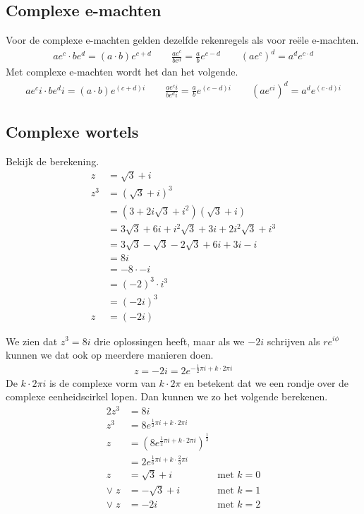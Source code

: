 \documentclass[11pt,fleqn]{book} %
\begin{document}
\subsection{Complexe e-machten}
Voor de complexe e-machten gelden dezelfde rekenregels als voor reële e-machten.
\begin{align*}
ae^c\cdot be^d=(a\cdot b)e^{c+d}\qquad \frac{ae^c}{be^d}=\frac{a}{b}e^{c-d}\qquad (ae^c)^d=a^de^{c\cdot d}
\end{align*}
Met complexe e-machten wordt het dan het volgende.
\begin{align*}
ae^ci\cdot be^di=(a\cdot b)e^{(c+d)i}\qquad \frac{ae^ci}{be^di}=\frac{a}{b}e^{(c-d)i}\qquad (ae^{ci})^d=a^de^{(c\cdot d)i}
\end{align*}

\subsection{Complexe wortels}
Bekijk de berekening.
\begin{align*}
z &= \sqrt{3}+i\\
z^3 &= (\sqrt{3}+i)^3\\
&= (3+2i\sqrt{3}+i^2)(\sqrt{3}+i)\\
&= 3\sqrt{3}+6i+i^2\sqrt{3}+3i+2i^2\sqrt{3}+i^3\\
&= 3\sqrt{3}-\sqrt{3}-2\sqrt{3}+6i+3i-i\\
&= 8i\\
&= -8\cdot -i\\
&= (-2)^3\cdot i^3\\
&= (-2i)^3\\
z &= (-2i)
\end{align*}

We zien dat $z^3=8i$ drie oplossingen heeft, maar als we $-2i$ schrijven als $re^{i\phi}$ kunnen we dat ook op meerdere manieren doen.
\begin{align*}
z=-2i=2e^{-\frac{1}{2}\pi i+k\cdot 2\pi i}
\end{align*}
De $k\cdot 2\pi i$ is de complexe vorm van $k\cdot 2\pi$ en betekent dat we een rondje over de complexe eenheidscirkel lopen. Dan kunnen we zo het volgende berekenen.
\begin{alignat*}{2}
z^3 &=8i &\\
z^3 &=8e^{\frac{1}{2}\pi i +k\cdot 2\pi i} &\\
z &={(8e^{\frac{1}{2}\pi i +k\cdot 2\pi i})}^{\frac{1}{3}} &\\
&= 2e^{\frac{1}{6}\pi i+k\cdot \frac{2}{3}\pi i} &\\
z &=\sqrt{3}+i\quad &\text{met }k=0 \\
\vee \; z &=-\sqrt{3}+i\quad &\text{met }k=1\\
\vee \; z &=-2i\quad &\text{met }k=2
\end{alignat*}
\end{document}
